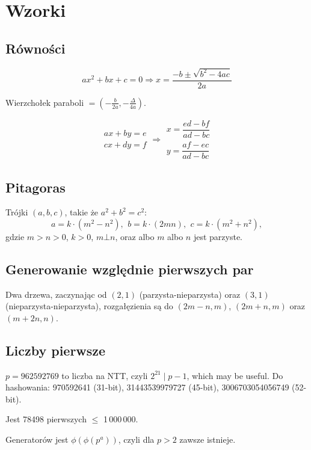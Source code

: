 \chapter{Wzorki}

\section{Równości}
\[ax^2+bx+c=0 \Rightarrow x = \frac{-b\pm\sqrt{b^2-4ac}}{2a}\]

Wierzchołek paraboli $= (- \frac{b}{2a}, - \frac{\Delta}{4a})$.

\[\begin{aligned}ax+by=e\\cx+dy=f\end{aligned}
\Rightarrow
\begin{aligned}x=\dfrac{ed-bf}{ad-bc}\\y=\dfrac{af-ec}{ad-bc}\end{aligned}\]

\section{Pitagoras}
Trójki $(a, b, c)$, takie że $a^2+b^2=c^2$:
 \[ a=k\cdot (m^{2}-n^{2}),\ \,b=k\cdot (2mn),\ \,c=k\cdot (m^{2}+n^{2}), \]
 gdzie $m > n > 0$, $k > 0$, $m \bot n$, oraz albo $m$ albo $n$ jest parzyste.

\section{Generowanie względnie pierwszych par}
Dwa drzewa, zaczynając od $(2, 1)$ (parzysta-nieparzysta) oraz $(3, 1)$ (nieparzysta-nieparzysta), rozgałęzienia są do $(2m-n,m)$, $(2m+n,m)$ oraz $(m+2n,n)$.

\section{Liczby pierwsze}
	$p=962592769$ to liczba na NTT, czyli $2^{21} \mid p-1$, which may be useful. Do hashowania:
	970592641 (31-bit), 31443539979727 (45-bit), 3006703054056749 (52-bit). 

	Jest 78498 pierwszych $\leq$ 1\,000\,000.

	Generatorów jest $\phi(\phi(p^a))$, czyli dla $p>2$ zawsze istnieje.

